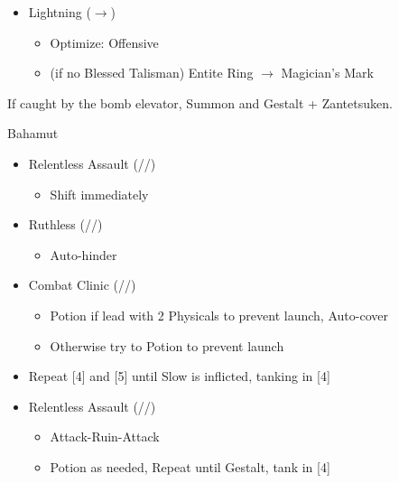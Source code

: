 \begin{multicols}{2}
\begin{menu}
\begin{itemize}
\begin{itemize}
\begin{itemize}
              \end{itemize}
        \item Lightning ($\rightarrow$)
              \begin{itemize}
                \item Optimize: Offensive
                \item (if no Blessed Talisman) Entite Ring $\rightarrow$ Magician's Mark
              \end{itemize}
      \end{itemize}
    \end{itemize}
  \end{menu}
  If caught by the bomb elevator, Summon and Gestalt + Zantetsuken.
  \renewcommand{\first}{[1] Relentless Assault (\com/\rav/\rav)}
  \renewcommand{\fifth}{[5] Ruthless (\sab/\com/\rav)
    \renewcommand{\fourth}{[4] Combat Clinic (\sen/\med/\med)}}
  \begin{battle}{Bahamut}
    \begin{itemize}
      \item \first
            \begin{itemize}
              \item Shift immediately
            \end{itemize}
      \item \fifth
            \begin{itemize}
              \item Auto-hinder
            \end{itemize}
      \item \fourth
            \begin{itemize}
              \item Potion if lead with 2 Physicals to prevent launch, Auto-cover
              \item Otherwise try to Potion to prevent launch
            \end{itemize}
      \item Repeat [4] and [5] until Slow is inflicted, tanking in [4]
      \item \first
            \begin{itemize}
              \item Attack-Ruin-Attack
              \item Potion as needed, Repeat until Gestalt, tank in [4]
            \end{itemize}
    \end{itemize}
  \end{battle}
\end{multicols}
